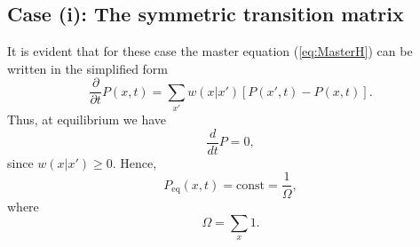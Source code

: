 \subsection{Case (i): The symmetric transition matrix}
It is evident that for these case the master equation (\ref{eq:MasterH}) can
be written in the simplified form
\begin{equation}
\label{eq:MasterHSym}
  \frac{\partial}{\partial t} P(x,t) = \sum_{x'} 
   w(x|x') [P(x',t) - P(x,t)].
\end{equation}
Thus, at equilibrium we have
\begin{displaymath}
  \frac{d}{dt}P = 0,
\end{displaymath}
since $w(x|x') \ge 0$. Hence,
\begin{equation}
\label{eq:MasterHEqSym}
  P_{\textrm{eq}} (x,t) = \textrm{const} = \frac{1}{\Omega},
\end{equation}
where 
\begin{displaymath}
  \Omega = \sum_x 1.
\end{displaymath}

